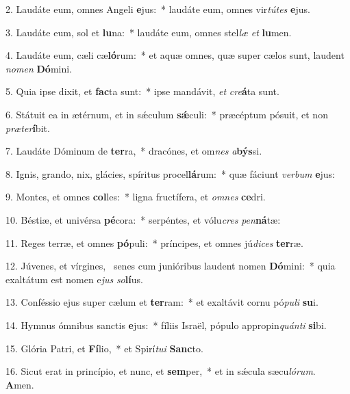 2. Laudáte eum, omnes Angeli \textbf{e}jus:~*  laudáte eum, omnes vir\textit{tú}\textit{tes} \textbf{e}jus.\

3. Laudáte eum, sol et \textbf{lu}na:~*  laudáte eum, omnes stel\textit{læ} \textit{et} \textbf{lu}men.\

4. Laudáte eum, cæli cæ\textbf{ló}rum:~*  et aquæ omnes, quæ super cælos sunt, laudent \textit{no}\textit{men} \textbf{Dó}mini.\

5. Quia ipse dixit, et \textbf{fac}ta sunt:~*  ipse mandávit, \textit{et} \textit{cre}\textbf{á}ta sunt.\

6. Státuit ea in ætérnum, et in sǽculum \textbf{sǽ}culi:~*  præcéptum pósuit, et non \textit{præ}\textit{ter}\textbf{í}bit.\

7. Laudáte Dóminum de \textbf{ter}ra,~*  dracónes, et om\textit{nes} \textit{a}\textbf{býs}si.\

8. Ignis, grando, nix, glácies, spíritus procel\textbf{lá}rum:~*  quæ fáciunt \textit{ver}\textit{bum} \textbf{e}jus:\

9. Montes, et omnes \textbf{col}les:~*  ligna fructífera, et \textit{om}\textit{nes} \textbf{ce}dri.\

10. Béstiæ, et univérsa \textbf{pé}cora:~*  serpéntes, et vólu\textit{cres} \textit{pen}\textbf{ná}tæ:\

11. Reges terræ, et omnes \textbf{pó}puli:~*  príncipes, et omnes jú\textit{di}\textit{ces} \textbf{ter}ræ.\

12. Júvenes, et vírgines, \dag\  senes cum junióribus laudent nomen \textbf{Dó}mini:~*  quia exaltátum est nomen e\textit{jus} \textit{so}\textbf{lí}us.\

13. Conféssio ejus super cælum et \textbf{ter}ram:~*  et exaltávit cornu pó\textit{pu}\textit{li} \textbf{su}i.\

14. Hymnus ómnibus sanctis \textbf{e}jus:~*  fíliis Israël, pópulo appropin\textit{quán}\textit{ti} \textbf{si}bi.\

15. Glória Patri, et \textbf{Fí}lio,~*  et Spirí\textit{tu}\textit{i} \textbf{Sanc}to.\

16. Sicut erat in princípio, et nunc, et \textbf{sem}per,~*  et in sǽcula sæcu\textit{ló}\textit{rum}. \textbf{A}men.\

